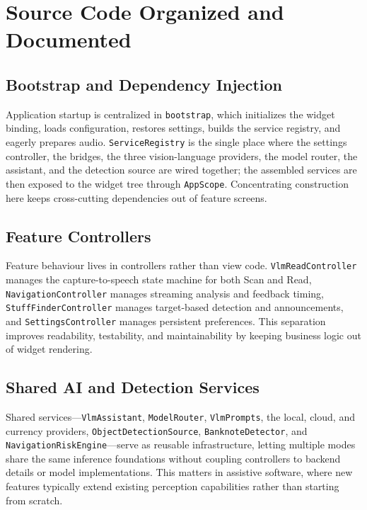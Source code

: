 \documentclass[12pt,a4paper]{report}
\begin{document}
\section{Source Code Organized and Documented}
\subsection{Bootstrap and Dependency Injection}
Application startup is centralized in \texttt{bootstrap}, which initializes the widget binding, loads configuration, restores settings, builds the service registry, and eagerly prepares audio. \texttt{ServiceRegistry} is the single place where the settings controller, the bridges, the three vision-language providers, the model router, the assistant, and the detection source are wired together; the assembled services are then exposed to the widget tree through \texttt{AppScope}. Concentrating construction here keeps cross-cutting dependencies out of feature screens.

\subsection{Feature Controllers}
Feature behaviour lives in controllers rather than view code. \texttt{VlmReadController} manages the capture-to-speech state machine for both Scan and Read, \texttt{NavigationController} manages streaming analysis and feedback timing, \texttt{StuffFinderController} manages target-based detection and announcements, and \texttt{SettingsController} manages persistent preferences. This separation improves readability, testability, and maintainability by keeping business logic out of widget rendering.

\subsection{Shared AI and Detection Services}
Shared services---\texttt{VlmAssistant}, \texttt{ModelRouter}, \texttt{VlmPrompts}, the local, cloud, and currency providers, \texttt{ObjectDetectionSource}, \texttt{BanknoteDetector}, and \texttt{NavigationRiskEngine}---serve as reusable infrastructure, letting multiple modes share the same inference foundations without coupling controllers to backend details or model implementations. This matters in assistive software, where new features typically extend existing perception capabilities rather than starting from scratch.
\end{document}
